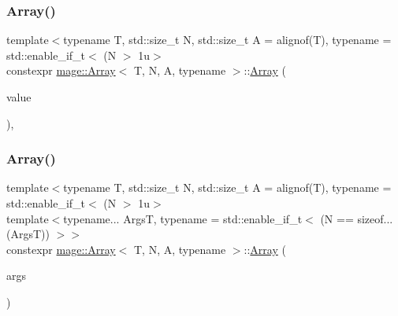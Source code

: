 \mbox{\label{structmage_1_1_array_a1f206f942c1318eb7f57c7e0666bc923}} 
\subsubsection{\texorpdfstring{Array()}{Array()}\hspace{0.1cm}{\footnotesize\ttfamily [2/10]}}
{\footnotesize\ttfamily template$<$typename T, std\+::size\+\_\+t N, std\+::size\+\_\+t A = alignof(\+T), typename  = std\+::enable\+\_\+if\+\_\+t$<$ (\+N $>$ 1u$>$ \\
constexpr \mbox{\hyperlink{structmage_1_1_array}{mage\+::\+Array}}$<$ T, N, A, typename $>$\+::\mbox{\hyperlink{structmage_1_1_array}{Array}} (\begin{DoxyParamCaption}\item[{const T \&}]{value }\end{DoxyParamCaption})\hspace{0.3cm}{\ttfamily [explicit]}, {\ttfamily [noexcept]}}

\mbox{\label{structmage_1_1_array_ab6dbce28b41b7ef1e9c0195f24f378a6}} 
\subsubsection{\texorpdfstring{Array()}{Array()}\hspace{0.1cm}{\footnotesize\ttfamily [3/10]}}
{\footnotesize\ttfamily template$<$typename T, std\+::size\+\_\+t N, std\+::size\+\_\+t A = alignof(\+T), typename  = std\+::enable\+\_\+if\+\_\+t$<$ (\+N $>$ 1u$>$ \\
template$<$typename... ArgsT, typename  = std\+::enable\+\_\+if\+\_\+t$<$ (\+N == sizeof...(\+Args\+T)) $>$$>$ \\
constexpr \mbox{\hyperlink{structmage_1_1_array}{mage\+::\+Array}}$<$ T, N, A, typename $>$\+::\mbox{\hyperlink{structmage_1_1_array}{Array}} (\begin{DoxyParamCaption}\item[{ArgsT \&\&...}]{args }\end{DoxyParamCaption})\hspace{0.3cm}{\ttfamily [noexcept]}}

